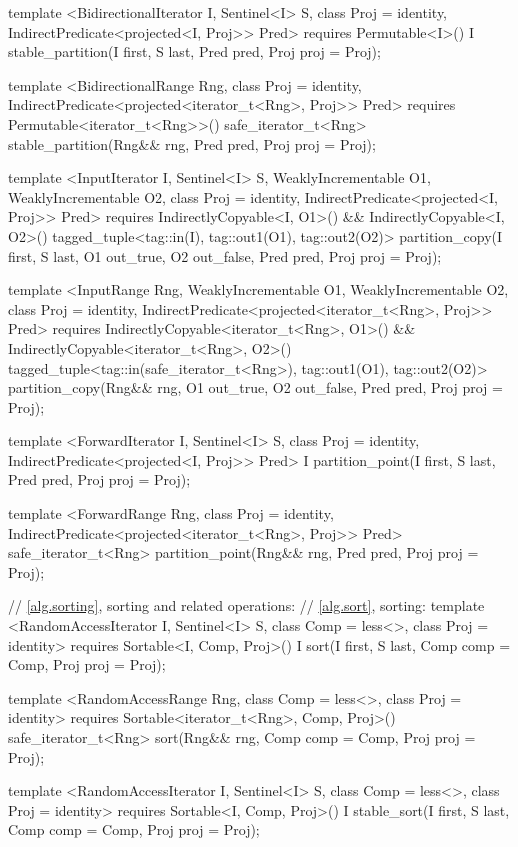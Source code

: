 \begin{codeblock}
{{{{  template <BidirectionalIterator I, Sentinel<I> S, class Proj = identity,
      IndirectPredicate<projected<I, Proj>> Pred>
    requires Permutable<I>()
    I stable_partition(I first, S last, Pred pred, Proj proj = Proj{});

  template <BidirectionalRange Rng, class Proj = identity,
      IndirectPredicate<projected<iterator_t<Rng>, Proj>> Pred>
    requires Permutable<iterator_t<Rng>>()
    safe_iterator_t<Rng>
      stable_partition(Rng&& rng, Pred pred, Proj proj = Proj{});

  template <InputIterator I, Sentinel<I> S, WeaklyIncrementable O1, WeaklyIncrementable O2,
      class Proj = identity, IndirectPredicate<projected<I, Proj>> Pred>
    requires IndirectlyCopyable<I, O1>() && IndirectlyCopyable<I, O2>()
    tagged_tuple<tag::in(I), tag::out1(O1), tag::out2(O2)>
      partition_copy(I first, S last, O1 out_true, O2 out_false, Pred pred,
                     Proj proj = Proj{});

  template <InputRange Rng, WeaklyIncrementable O1, WeaklyIncrementable O2,
      class Proj = identity,
      IndirectPredicate<projected<iterator_t<Rng>, Proj>> Pred>
    requires IndirectlyCopyable<iterator_t<Rng>, O1>() &&
      IndirectlyCopyable<iterator_t<Rng>, O2>()
    tagged_tuple<tag::in(safe_iterator_t<Rng>), tag::out1(O1), tag::out2(O2)>
      partition_copy(Rng&& rng, O1 out_true, O2 out_false, Pred pred, Proj proj = Proj{});

  template <ForwardIterator I, Sentinel<I> S, class Proj = identity,
      IndirectPredicate<projected<I, Proj>> Pred>
    I partition_point(I first, S last, Pred pred, Proj proj = Proj{});

  template <ForwardRange Rng, class Proj = identity,
      IndirectPredicate<projected<iterator_t<Rng>, Proj>> Pred>
    safe_iterator_t<Rng>
      partition_point(Rng&& rng, Pred pred, Proj proj = Proj{});

  // \ref{alg.sorting}, sorting and related operations:
  // \ref{alg.sort}, sorting:
  template <RandomAccessIterator I, Sentinel<I> S, class Comp = less<>,
      class Proj = identity>
    requires Sortable<I, Comp, Proj>()
    I sort(I first, S last, Comp comp = Comp{}, Proj proj = Proj{});

  template <RandomAccessRange Rng, class Comp = less<>, class Proj = identity>
    requires Sortable<iterator_t<Rng>, Comp, Proj>()
    safe_iterator_t<Rng>
      sort(Rng&& rng, Comp comp = Comp{}, Proj proj = Proj{});

  template <RandomAccessIterator I, Sentinel<I> S, class Comp = less<>,
      class Proj = identity>
    requires Sortable<I, Comp, Proj>()
    I stable_sort(I first, S last, Comp comp = Comp{}, Proj proj = Proj{});

}}}}
\end{codeblock}
